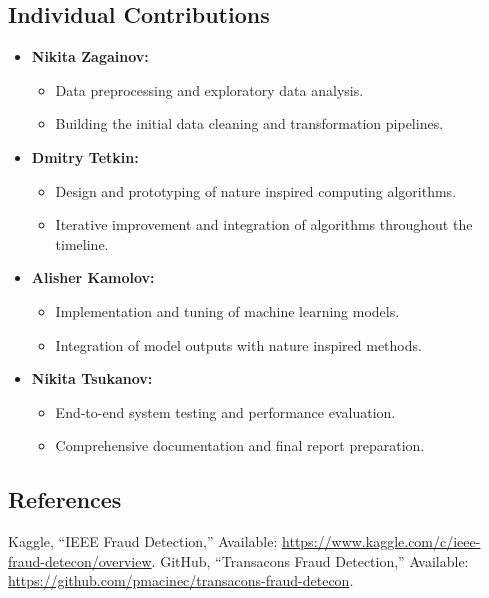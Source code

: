 \documentclass[conference]{IEEEtran}
\begin{document}
\subsection{Individual Contributions}
\begin{itemize}
    \item \textbf{Nikita Zagainov:}
    \begin{itemize}
        \item Data preprocessing and exploratory data analysis.
        \item Building the initial data cleaning and transformation pipelines.
    \end{itemize}
    \item \textbf{Dmitry Tetkin:}
    \begin{itemize}
        \item Design and prototyping of nature inspired computing algorithms.
        \item Iterative improvement and integration of algorithms throughout the timeline.
    \end{itemize}
    \item \textbf{Alisher Kamolov:}
    \begin{itemize}
        \item Implementation and tuning of machine learning models.
        \item Integration of model outputs with nature inspired methods.
    \end{itemize}
    \item \textbf{Nikita Tsukanov:}
    \begin{itemize}
        \item End-to-end system testing and performance evaluation.
        \item Comprehensive documentation and final report preparation.
    \end{itemize}
\end{itemize}

\subsection{References}
\begin{thebibliography}{00}
 Kaggle, ``IEEE Fraud Detection,'' Available: \href{https://www.kaggle.com/c/ieee-fraud-detecon/overview}{https://www.kaggle.com/c/ieee-fraud-detecon/overview}.
 GitHub, ``Transacons Fraud Detection,'' Available: \href{https://github.com/pmacinec/transacons-fraud-detecon}{https://github.com/pmacinec/transacons-fraud-detecon}.
\end{thebibliography}

\vspace{12pt}
\end{document}
